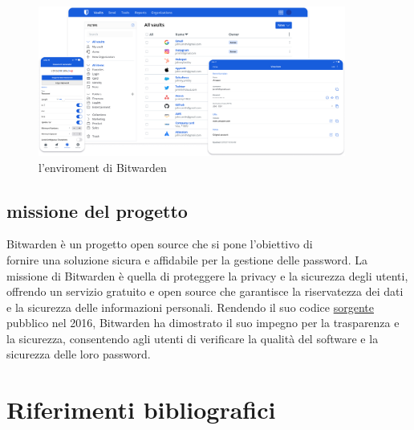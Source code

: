 \documentclass[a4paper,12pt]{report}
\begin{document}
		\begin{figure}[H]
			\centering
			\includegraphics[width=0.9\textwidth]{wardenEnviroment.png}
			\caption{l'enviroment di Bitwarden}
			\label{fig:eviroment}
		\end{figure}

		\section{missione del progetto}
		Bitwarden è un progetto open source che si pone l'obiettivo di \\
		fornire
		una soluzione sicura e affidabile per la gestione delle password. La
		missione di Bitwarden è quella di proteggere la privacy e la sicurezza
		degli utenti, offrendo un servizio gratuito e open source che garantisce
		la riservatezza dei dati e la sicurezza delle informazioni personali.
		Rendendo il suo codice \href{https://github.com/bitwarden}{sorgente}
		pubblico nel 2016, Bitwarden ha dimostrato il suo impegno per la
		trasparenza e la sicurezza, consentendo agli utenti di verificare la
		qualità del software e la sicurezza delle loro password.\\
		
		


	\newpage
	
	\renewcommand{\bibsection}{}
	\chapter*{Riferimenti bibliografici}
	
\end{document}
